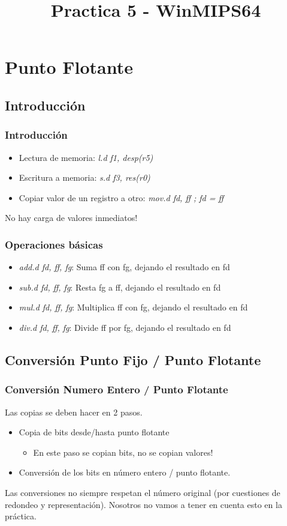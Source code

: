 \documentclass{beamer}
\title{Practica 5 - WinMIPS64}
\begin{document}
\section{Punto Flotante}

\subsection{Introducción}
\begin{frame}
\frametitle{Introducción}
\begin{itemize}
\item Lectura de memoria: \emph{l.d f1, desp(r5)}
\item Escritura a memoria: \emph{s.d f3, res(r0)}
\item Copiar valor de un registro a otro: \emph{mov.d fd, ff ; fd = ff }
\end{itemize}
No hay carga de valores inmediatos!
\end{frame}


\begin{frame}
\frametitle{Operaciones básicas}
\begin{itemize}
\item \emph{add.d fd, ff, fg}: Suma ff con fg, dejando el resultado en fd
\item \emph{sub.d fd, ff, fg}: Resta fg a ff, dejando el resultado en fd
\item \emph{mul.d fd, ff, fg}: Multiplica ff con fg, dejando el resultado en fd
\item \emph{div.d fd, ff, fg}: Divide ff por fg, dejando el resultado en fd
\end{itemize}
\end{frame}

\subsection{Conversión Punto Fijo / Punto Flotante}

\begin{frame}
\frametitle{Conversión Numero Entero / Punto Flotante}
Las copias se deben hacer en 2 pasos.
\begin{itemize}
\item Copia de bits desde/hasta punto flotante
\begin{itemize}
\item En este paso se copian bits, no se copian valores!
\end{itemize}
\item Conversión de los bits en número entero / punto flotante.
\end{itemize}

Las conversiones no siempre respetan el número original (por cuestiones de redondeo y representación). Nosotros no vamos a tener en cuenta esto en la práctica.
\end{frame}
\end{document}
